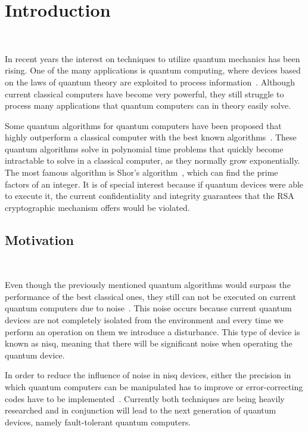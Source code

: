\chapter{Introduction}\label{chapter:introduction} \

In recent years the interest on techniques to utilize quantum mechanics has been rising.
One of the many applications is quantum computing, where devices based on the laws
of quantum theory are exploited to process information~\cite{national_academies_of_sciences_engineering_and_medicine_quantum_2019}.
Although current classical computers have become very powerful, they still struggle to
process many applications that quantum computers can in theory easily solve. \

Some quantum algorithms for quantum computers have been proposed that highly
outperform a classical computer with the best known algorithms~\cite{shor_polynomial-time_1997, van_dam_quantum_2006, hallgren_polynomial-time_2007}.
These quantum algorithms solve in polynomial time problems that quickly become
intractable to solve in a classical computer, as they normally grow exponentially.
The most famous algorithm is Shor's algorithm~\cite{shor_polynomial-time_1997}, which can find the prime factors
of an integer. It is of special interest because if quantum devices
were able to execute it, the current confidentiality and integrity guarantees
that the RSA~\cite{rivest_method_1978} cryptographic mechanism offers would be violated. \

\section{Motivation} \

Even though the previously mentioned quantum algorithms would surpass the performance
of the best classical ones, they still can not be executed on current quantum
computers due to noise~\cite{preskill_quantum_2018}. This noise occurs because
current quantum devices are not completely isolated from the environment and every
time we perform an operation on them we introduce a disturbance. This type of device
is known as \ac{nisq}, meaning that there will be significant noise when operating
the quantum device. \

In order to reduce the influence of noise in \ac{nisq} devices, either the precision
in which quantum computers can be manipulated has to improve or error-correcting
codes have to be implemented~\cite{shor_quantum_nodate}. Currently both techniques are
being heavily researched and in conjunction will lead to the next generation of
quantum devices, namely fault-tolerant quantum computers. \

